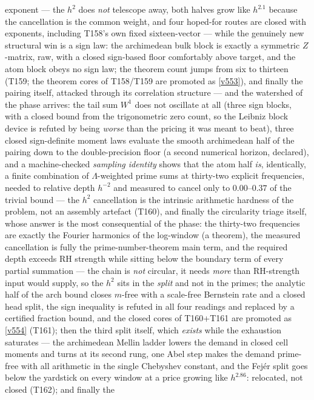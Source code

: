\documentclass[11pt,a4paper]{article}
\begin{document}
exponent --- the $h^2$ does \emph{not} telescope away, both halves grow like $h^{2.1}$
because the cancellation is the common weight, and four hoped-for routes are closed with
exponents, including T158's own fixed sixteen-vector --- while the genuinely new structural
win is a sign law: the archimedean bulk block is exactly a symmetric $Z$-matrix, raw, with
a closed sign-based floor comfortably above target, and the atom block obeys no sign law;
the theorem count jumps from six to thirteen (T159; the theorem cores of T158/T159 are
promoted as \vref{v553}), and finally the pairing itself, attacked through its correlation
structure --- and the watershed of the phase arrives: the tail sum $W^1$ does not oscillate
at all (three sign blocks, with a closed bound from the trigonometric zero count, so the
Leibniz block device is refuted by being \emph{worse} than the pricing it was meant to
beat), three closed sign-definite moment laws evaluate the smooth archimedean half of the
pairing down to the double-precision floor (a second numerical horizon, declared), and a
machine-checked \emph{sampling identity} shows that the atom half \emph{is}, identically, a
finite combination of $\Lambda$-weighted prime sums at thirty-two explicit frequencies,
needed to relative depth $h^{-2}$ and measured to cancel only to $0.00$--$0.37$ of the
trivial bound --- the $h^2$ cancellation is the intrinsic arithmetic hardness of the
problem, not an assembly artefact (T160), and finally the circularity triage itself, whose
answer is the most consequential of the phase: the thirty-two frequencies are exactly the
Fourier harmonics of the log-window (a theorem), the measured cancellation is fully the
prime-number-theorem main term, and the required depth exceeds RH strength while sitting
below the boundary term of every partial summation --- the chain is \emph{not} circular, it
needs \emph{more} than RH-strength input would supply, so the $h^2$ sits in the
\emph{split} and not in the primes; the analytic half of the arch bound closes $m$-free
with a scale-free Bernstein rate and a closed head split, the sign inequality is refuted in
all four readings and replaced by a certified fraction bound, and the closed cores of
T160+T161 are promoted as \vref{v554} (T161); then the third split itself, which \emph{exists}
while the exhaustion saturates --- the archimedean Mellin ladder lowers the demand in closed
cell moments and turns at its second rung, one Abel step makes the demand prime-free with all
arithmetic in the single Chebyshev constant, and the Fej\'er split goes below the yardstick on
every window at a price growing like $h^{2.86}$: relocated, not closed (T162); and finally the
\end{document}
